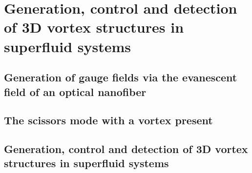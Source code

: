 \chapter{Generation, control and detection of 3D vortex structures in superfluid systems}
\label{ch:vortex_states}

\section{Generation of gauge fields via the evanescent field of an optical nanofiber}

\section{The scissors mode with a vortex present}

\section{Generation, control and detection of 3D vortex structures in superfluid
 systems}
